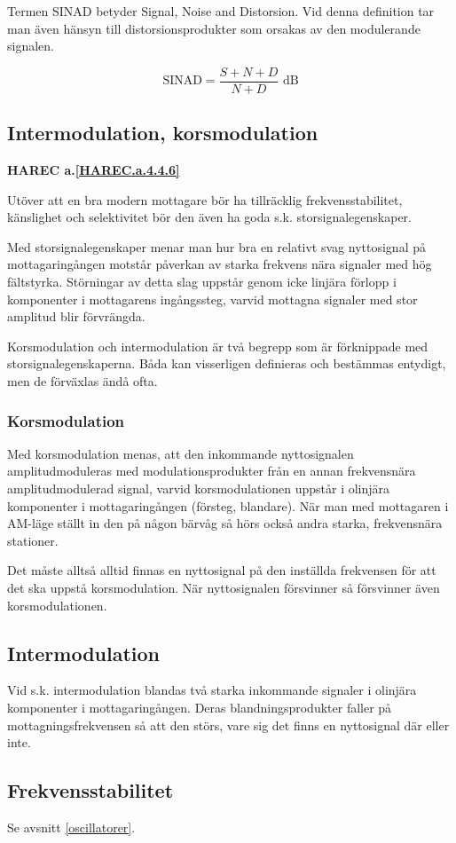 Termen SINAD betyder Signal, Noise and Distorsion. Vid denna
definition tar man även hänsyn till distorsionsprodukter som orsakas
av den modulerande signalen. 

\[
\text{SINAD} = \frac{S+N+D}{N+D}\text{ dB}
\]

\subsection{Intermodulation, korsmodulation}
\textbf{HAREC a.\ref{HAREC.a.4.4.6}\label{myHAREC.a.4.4.6}}

Utöver att en bra modern mottagare bör ha tillräcklig
frekvensstabilitet, känslighet och selektivitet bör den även ha goda
s.k. storsignalegenskaper.

Med storsignalegenskaper menar man hur bra en relativt svag
nyttosignal på mottagaringången motstår påverkan av starka
frekvens nära signaler med hög fältstyrka. Störningar av detta slag
uppstår genom icke linjära förlopp i komponenter i mottagarens
ingångssteg, varvid mottagna signaler med stor amplitud blir
förvrängda.

Korsmodulation och intermodulation är två begrepp som är förknippade
med storsignalegenskaperna. Båda kan visserligen definieras och
bestämmas entydigt, men de förväxlas ändå ofta.

\subsubsection{Korsmodulation}

Med korsmodulation menas, att den inkommande nyttosignalen
amplitudmoduleras med modulationsprodukter från en annan frekvensnära
amplitudmodulerad signal, varvid korsmodulationen uppstår i olinjära
komponenter i mottagaringången (försteg, blandare). När man med
mottagaren i AM-läge ställt in den på någon bärvåg så hörs också andra
starka, frekvensnära stationer.

Det måste alltså alltid finnas en nyttosignal på den inställda
frekvensen för att det ska uppstå korsmodulation. När nyttosignalen
försvinner så försvinner även korsmodulationen.

\subsection{Intermodulation}

Vid s.k. intermodulation blandas två starka inkommande signaler i
olinjära komponenter i mottagaringången. Deras blandningsprodukter
faller på mottagningsfrekvensen så att den störs, vare sig det finns
en nyttosignal där eller inte.

\subsection{Frekvensstabilitet}

Se avsnitt \ref{oscillatorer}.
